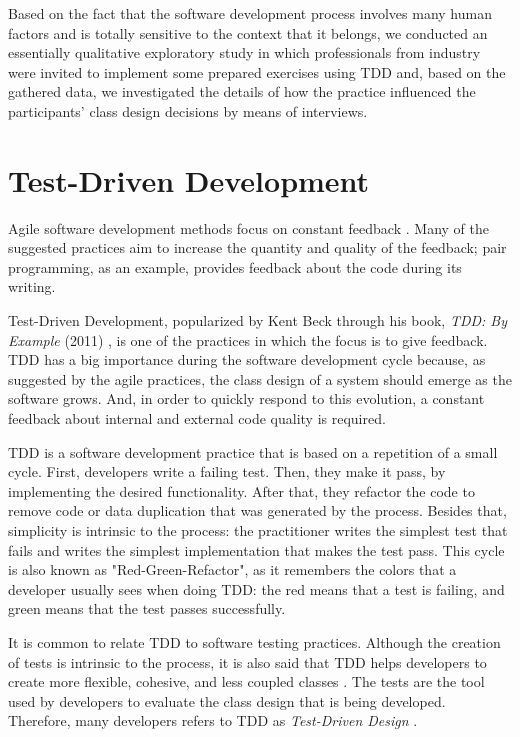 \documentclass[times]{speauth}
\begin{document}
Based on the fact that the software development process involves many
human factors and is totally sensitive to the context that it belongs,
we conducted an essentially qualitative exploratory study in which professionals
from industry were invited to implement some prepared exercises using TDD and,
based on the gathered data, we investigated the details of how the practice influenced
the participants' class design decisions by means of interviews.

\section{Test-Driven Development}

Agile software development methods focus on constant feedback \cite{AgileManifesto}. 
Many of the suggested practices
aim to increase the quantity and quality of the feedback; pair programming,
as an example, provides feedback about the code during its writing.

Test-Driven Development, popularized by Kent Beck through his book, \textit{TDD: By Example} (2011)
\cite{TDDByExample}, is one of the practices in which the focus is to give feedback. TDD has
a big importance during the software development cycle because, as suggested by the agile
practices, the class design of a system should emerge as the software grows. And, in order
to quickly respond to this evolution, a constant feedback about internal and external code
quality is required.

TDD is a software development practice that is based on a repetition of a small
cycle. First, developers write a failing test. Then, they make it pass,
by implementing the desired functionality. After that, they refactor the code
to remove code or data duplication that was generated by the process. Besides that,
simplicity is intrinsic to the process: the practitioner writes the simplest
test that fails and writes the simplest implementation that makes the
test pass. This cycle is also known as "Red-Green-Refactor", as it remembers the
colors that a developer usually sees when doing TDD: the red means that a test
is failing, and green means that the test passes successfully.

It is common to relate TDD to software testing practices. Although the creation
of tests is intrinsic to the process, it is also said that TDD helps developers
to create more flexible, cohesive, and less coupled classes \cite{tdd-taxonomy}. 
The tests are the tool used by developers to evaluate the class design that is being developed.
Therefore, many developers refers to TDD 
as \textit{Test-Driven Design} \cite{tdd-taxonomy}.
\end{document}
